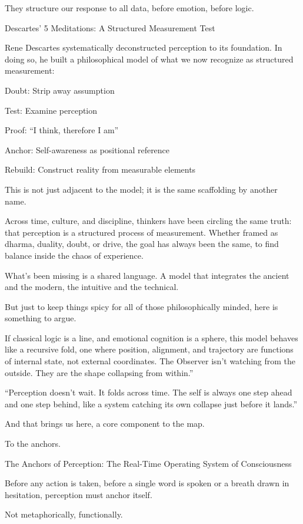 \documentclass[12pt]{article}
\begin{document}
They structure our response to all data, before emotion, before logic.

Descartes’ 5 Meditations: A Structured Measurement Test

Rene Descartes systematically deconstructed perception to its foundation. In doing so, he built a philosophical model of what we now recognize as structured measurement:

Doubt: Strip away assumption

Test: Examine perception

Proof: “I think, therefore I am”

Anchor: Self-awareness as positional reference

Rebuild: Construct reality from measurable elements

This is not just adjacent to the model; it is the same scaffolding by another name.

Across time, culture, and discipline, thinkers have been circling the same truth: that perception is a structured process of measurement. Whether framed as dharma, duality, doubt, or drive, the goal has always been the same, to find balance inside the chaos of experience.

What’s been missing is a shared language. A model that integrates the ancient and the modern, the intuitive and the technical. 

But just to keep things spicy for all of those philosophically minded, here is something to argue.

If classical logic is a line, and emotional cognition is a sphere, this model behaves like a recursive fold, one where position, alignment, and trajectory are functions of internal state, not external coordinates. The Observer isn’t watching from the outside. They are the shape collapsing from within.”

“Perception doesn’t wait. It folds across time. The self is always one step ahead and one step behind, like a system catching its own collapse just before it lands.”

And that brings us here, a core component to the map. 

To the anchors. 

The Anchors of Perception: The Real-Time Operating System of Consciousness

Before any action is taken, before a single word is spoken or a breath drawn in hesitation, perception must anchor itself.

Not metaphorically, functionally.
\end{document}
